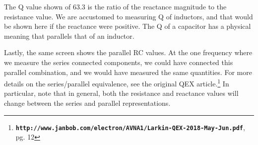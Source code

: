 The Q value shown of 63.3 is the ratio of the reactance magnitude to the resistance value.  We are accustomed to measuring Q of inductors, and that would be shown here if the reactance were positive.  The Q of a capacitor has a physical meaning that parallels that of an inductor.

Lastly, the same screen shows the parallel RC values. At the one frequency where we measure the series connected components, we could have connected this parallel combination, and we would have measured the same quantities.
For more details on the series/parallel equivalence, see the original QEX article.\footnote{\textbf{\texttt{http://www.janbob.com/electron/AVNA1/Larkin-QEX-2018-May-Jun.pdf}}, pg. 12} In particular, note that in general, both the resistance and reactance values will change between the series and parallel representations.

